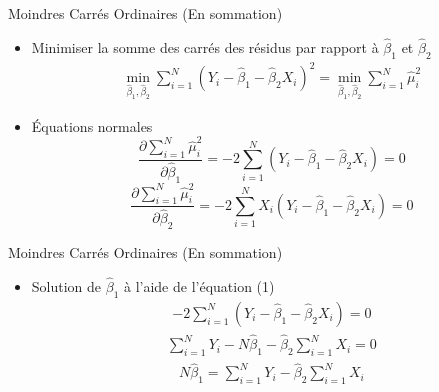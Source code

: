 \documentclass{beamer}
\begin{document}
\begin{frame}{Moindres Carrés Ordinaires (En sommation)}
\begin{itemize}
  \item Minimiser la somme des carrés des résidus par rapport à \( \hat{\beta}_1 \) et \( \hat{\beta}_2 \)
  \begin{align*}
    \min_{\hat{\beta}_1, \hat{\beta}_2} \sum_{i=1}^{N} (Y_i - \hat{\beta}_1 - \hat{\beta}_2 X_i)^2 = \min_{\hat{\beta}_1, \hat{\beta}_2} \sum_{i=1}^{N} \hat{\mu}_i^2
  \end{align*}
  \item Équations normales 
  \begin{equation}
    \frac{\partial \sum_{i=1}^{N} \hat{\mu}_i^2}{\partial \hat{\beta}_1} = -2 \sum_{i=1}^N (Y_i - \hat{\beta}_1 - \hat{\beta}_2 X_i) = 0
  \end{equation}
  \begin{equation}
    \frac{\partial \sum_{i=1}^{N} \hat{\mu}_i^2}{\partial \hat{\beta}_2} = -2 \sum_{i=1}^N X_i (Y_i - \hat{\beta}_1 - \hat{\beta}_2 X_i) = 0
  \end{equation}
\end{itemize}
\end{frame}

\begin{frame}{Moindres Carrés Ordinaires (En sommation)}
\begin{itemize}
  \item Solution de \( \hat{\beta}_1 \) à l'aide de l'équation (1)
  \begin{align*}
    -2 \sum_{i=1}^N (Y_i - \hat{\beta}_1 - \hat{\beta}_2 X_i) = 0
  \end{align*}
  \begin{align*}
    \sum_{i=1}^N Y_i - N \hat{\beta}_1 - \hat{\beta}_2 \sum_{i=1}^N X_i = 0
  \end{align*}
  \begin{align*}
    N \hat{\beta}_1 = \sum_{i=1}^N Y_i - \hat{\beta}_2 \sum_{i=1}^N X_i
  \end{align*}
\end{itemize}
\end{frame}
\end{document}

